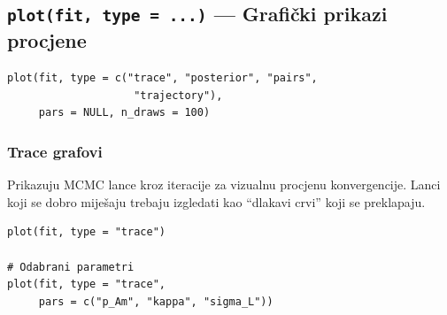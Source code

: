 \documentclass[11pt,a4paper]{article}
\newcommand{\code}[1]{\texttt{#1}}
\begin{document}
\subsection{\code{plot(fit, type = ...)} --- Grafički prikazi procjene}

\begin{lstlisting}
plot(fit, type = c("trace", "posterior", "pairs",
                    "trajectory"),
     pars = NULL, n_draws = 100)
\end{lstlisting}

\subsubsection{Trace grafovi}

Prikazuju MCMC lance kroz iteracije za vizualnu procjenu konvergencije.
Lanci koji se dobro miješaju trebaju izgledati kao ``dlakavi crvi'' koji
se preklapaju.

\begin{lstlisting}
plot(fit, type = "trace")

# Odabrani parametri
plot(fit, type = "trace",
     pars = c("p_Am", "kappa", "sigma_L"))
\end{lstlisting}
\end{document}
